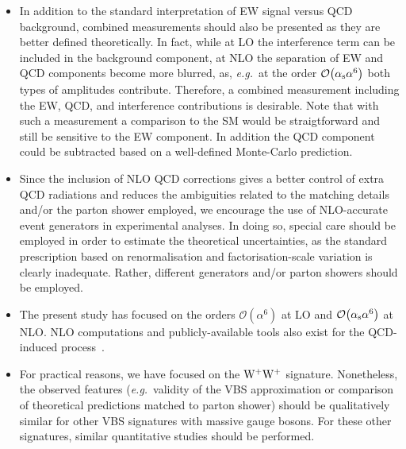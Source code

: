 \begin{itemize}
    \item In addition to the standard interpretation of EW signal versus QCD background, 
        combined measurements should also be presented as they are better defined theoretically. In fact, while at LO 
        the interference term can be included in the background component, at NLO the separation of EW and QCD components become more blurred, as, \emph{e.g.}\,
        at the order $\mathcal{O}{\left(\alpha_\text{s}\alpha^{6}\right)}$ both types of amplitudes contribute.
        Therefore, a combined measurement including the EW, QCD, and interference contributions is desirable.
        Note that with such a measurement a comparison to the SM would
        be straigtforward and still be sensitive to the EW component.
        In addition the QCD component could be subtracted based on a
        well-defined Monte-Carlo prediction.

    \item Since the inclusion of NLO QCD corrections gives a better control of extra QCD radiations and reduces the ambiguities related to the 
        matching details and/or the parton shower employed, we encourage the use of NLO-accurate event generators in experimental analyses. In doing
        so, special care should be employed in order to estimate the theoretical uncertainties, as the standard prescription based on 
        renormalisation and factorisation-scale variation is clearly inadequate. Rather, different generators and/or parton showers should be employed.

    \item The present study has focused on the orders $\mathcal{O}{\left(\alpha^{6}\right)}$ at 
    LO and $\mathcal{O}{\left(\alpha_\text{s}\alpha^{6}\right)}$ at NLO. NLO computations and publicly-available tools also exist for the QCD-induced process~\cite{Rauch:2016pai,Melia:2010bm,Melia:2011gk,Campanario:2013gea,Baglio:2014uba,Biedermann:2017bss,Alwall:2014hca}.

    \item For practical reasons, we have focused on the ${\rm W}^+{\rm W}^+$ signature. Nonetheless, 
    the observed features 
    (\emph{e.g.}\ validity of the VBS approximation or comparison of theoretical predictions matched to parton shower) should 
    be qualitatively similar for other VBS signatures with massive gauge bosons. For these other signatures, similar quantitative studies should be performed.
\end{itemize}
